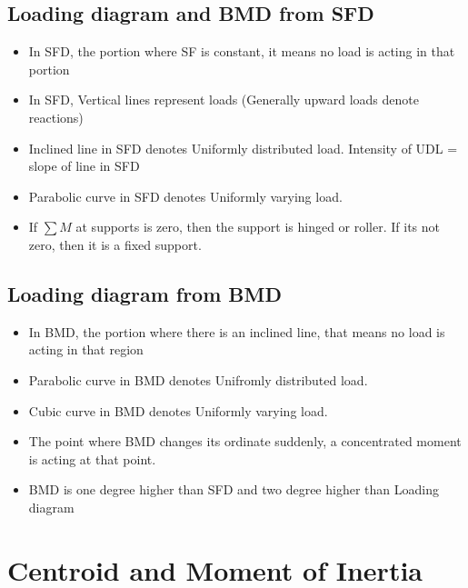 \documentclass[8pt]{report}
\begin{document}
	\section{Loading diagram and BMD from SFD}
		\begin{itemize}
			\item In SFD, the portion where SF is constant, it means no load is acting in that portion
			\item In SFD, Vertical lines represent loads (Generally upward loads denote reactions)
			\item Inclined line in SFD denotes Uniformly distributed load. Intensity of UDL = slope of line in SFD
			\item Parabolic curve in SFD denotes Uniformly varying load. 
			\item If $\sum M$ at supports is zero, then the support is hinged or roller. If its not zero, then it is a fixed support.
	\end{itemize}\hrulefill
	\section{Loading diagram from BMD}
		\begin{itemize}
			\item In BMD, the portion where there is an inclined line, that means no load is acting in that region
			\item Parabolic curve in BMD denotes Unifromly distributed load. 
			\item Cubic curve in BMD denotes Uniformly varying load.
			\item The point where BMD changes its ordinate suddenly, a concentrated moment is acting at that point. 
			\item BMD is one degree higher than SFD and two degree higher than Loading diagram
		\end{itemize}\hrulefill
\chapter{Centroid and Moment of Inertia}
\end{document}
